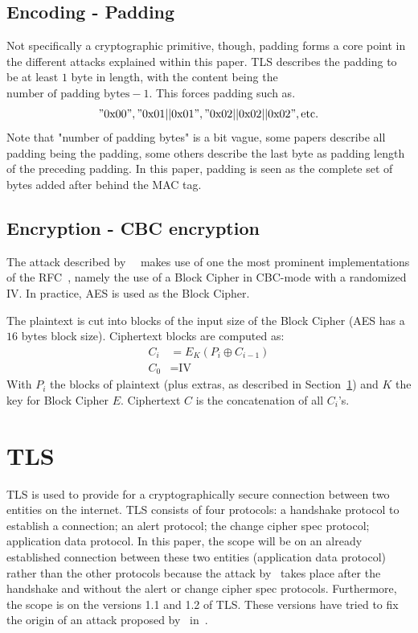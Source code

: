 \documentclass[10pt,conference,a4paper]{IEEEtran}
\begin{document}
\subsection{Encoding - Padding}
\label{sec:crypto:padding}
Not specifically a cryptographic primitive, though, padding forms a core point in the different attacks explained within this paper. TLS describes the padding to be at least $1$ byte in length, with the content being the $\text{number of padding bytes} - 1$. This forces padding such as.
\["0\text{x}00", "0\text{x}01||0\text{x}01", "0\text{x}02||0\text{x}02||0\text{x}02", \text{etc.} \]
Note that "number of padding bytes" is a bit vague, some papers describe all padding being the padding, some others describe the last byte as padding length of the preceding padding. In this paper, padding is seen as the complete set of bytes added after behind the MAC tag.

\subsection{Encryption - CBC encryption}
\label{sec:crypto:encryption}
The attack described by~\citeauthor{alfardan2013lucky}~\cite{alfardan2013lucky} makes use of one the most prominent implementations of the RFC~\cite{ietf2008transport}, namely the use of a Block Cipher in CBC-mode with a randomized IV. In practice, AES is used as the Block Cipher.

The plaintext is cut into blocks of the input size of the Block Cipher (AES has a $16$ bytes block size). Ciphertext blocks are computed as:
\[ 
\begin{split}
C_i &= E_K(P_i \oplus C_{i-1}) \\
C_0 &= \text{IV} 
\end{split}
\]
With $P_i$ the blocks of plaintext (plus extras, as described in Section~\ref{sec:tls}) and $K$ the key for Block Cipher $E$. Ciphertext $C$ is the concatenation of all $C_i$'s.



\section{TLS}
\label{sec:tls}
TLS is used to provide for a cryptographically secure connection between two entities on the internet. TLS consists of four protocols: a handshake protocol to establish a connection; an alert protocol; the change cipher spec protocol; application data protocol. In this paper, the scope will be on an already established connection between these two entities (application data protocol) rather than the other protocols because the attack by~\citeauthor{alfardan2013lucky} takes place after the handshake and without the alert or change cipher spec protocols. Furthermore, the scope is on the versions 1.1 and 1.2 of TLS. These versions have tried to fix the origin of an attack proposed by~\citeauthor{vaudenay2002security} in~\cite{vaudenay2002security}.
\end{document}
